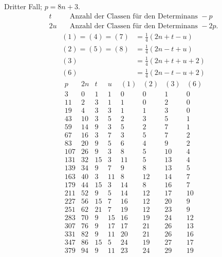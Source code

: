 %
Dritter Fall; $p=8n+3$.
\[
\begin{aligned}
t&\quad\text{Anzahl der Classen für den Determinans }-p\\
2u&\quad\text{Anzahl der Classen für den Determinans }-2p.
\end{aligned}
\]
\[
\begin{aligned}
(1)=(4)=(7)&=\tfrac14(2n+t-u)\\
(2)=(5)=(8)&=\tfrac14(2n-t+u)\\
(3)&=\tfrac14(2n+t+u+2)\\
(6)&=\tfrac14(2n-t-u+2)
\end{aligned}
\]
\[
\begin{array}{r|r|r|r|r|r|r|r}
p&2n&t&u&(1)&(2)&(3)&(6)\\\hline
3&0&1&1&0&0&1&0\\
11&2&3&1&1&0&2&0\\
19&4&3&3&1&1&3&0\\
43&10&3&5&2&3&5&1\\
59&14&9&3&5&2&7&1\\
67&16&3&7&3&5&7&2\\
83&20&9&5&6&4&9&2\\
107&26&9&3&8&5&10&4\\
131&32&15&3&11&5&13&4\\
139&34&9&7&9&8&13&5\\
163&40&3&11&8&12&14&7\\
179&44&15&3&14&8&16&7\\
211&52&9&5&14&12&17&10\\
227&56&15&7&16&12&20&9\\
251&62&21&7&19&12&23&9\\
283&70&9&15&16&19&24&12\\
307&76&9&17&17&21&26&13\\
331&82&9&11&20&21&26&16\\
347&86&15&5&24&19&27&17\\
379&94&9&11&23&24&29&19
\end{array}
\]


